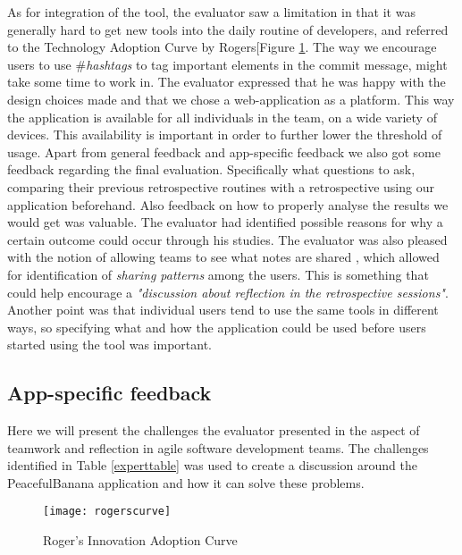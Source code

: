 As for integration of the tool, the evaluator saw a limitation in that it was generally hard to get new tools into the daily routine of developers\cite{rogers2010diffusion}, and referred to the Technology Adoption Curve by Rogers[Figure \ref{rogerscurve}. The way we encourage users to use \#\emph{hashtags} to tag important elements in the commit message, might take some time to work in. The evaluator expressed that he was happy with the design choices made and that we chose a web-application as a platform. This way the application is available for all individuals in the team, on a wide variety of devices. This availability is important in order to further lower the threshold of usage. Apart from general feedback and app-specific feedback we also got some feedback regarding the final evaluation. Specifically what questions to ask, comparing their previous retrospective routines with a retrospective using our application beforehand. Also feedback on how to properly analyse the results we would get was valuable. The evaluator had identified possible reasons for why a certain outcome could occur through his studies. The evaluator was also pleased with the notion of allowing teams to see what notes are shared , which allowed for identification of \emph{sharing patterns} among the users. This is something that could help encourage a \emph{"discussion about reflection in the retrospective sessions"}. Another point was that individual users tend to use the same tools in different ways, so specifying what and how the application could be used before users started using the tool was important.  
\subsection{App-specific feedback}
Here we will present the challenges the evaluator presented in the aspect of teamwork and reflection in agile software development teams. The challenges identified in Table \ref{experttable} was used to create a discussion around the PeacefulBanana application and how it can solve these problems. 
\begin{figure}[H]
    \centering
        \texttt{[image: rogerscurve]}
    \caption{Roger's Innovation Adoption Curve}
    \label{rogerscurve}
\end{figure}

\newpage

